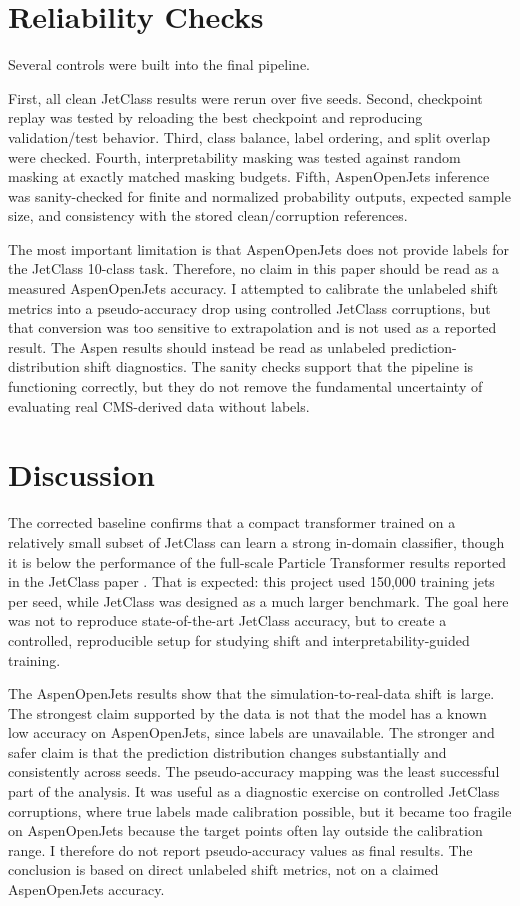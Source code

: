 \documentclass[11pt]{article}
\begin{document}
\section{Reliability Checks}

Several controls were built into the final pipeline.

First, all clean JetClass results were rerun over five seeds. Second, checkpoint replay was tested by reloading the best checkpoint and reproducing validation/test behavior. Third, class balance, label ordering, and split overlap were checked. Fourth, interpretability masking was tested against random masking at exactly matched masking budgets. Fifth, AspenOpenJets inference was sanity-checked for finite and normalized probability outputs, expected sample size, and consistency with the stored clean/corruption references.

The most important limitation is that AspenOpenJets does not provide labels for the JetClass 10-class task. Therefore, no claim in this paper should be read as a measured AspenOpenJets accuracy. I attempted to calibrate the unlabeled shift metrics into a pseudo-accuracy drop using controlled JetClass corruptions, but that conversion was too sensitive to extrapolation and is not used as a reported result. The Aspen results should instead be read as unlabeled prediction-distribution shift diagnostics. The sanity checks support that the pipeline is functioning correctly, but they do not remove the fundamental uncertainty of evaluating real CMS-derived data without labels.



\section{Discussion}

The corrected baseline confirms that a compact transformer trained on a relatively small subset of JetClass can learn a strong in-domain classifier, though it is below the performance of the full-scale Particle Transformer results reported in the JetClass paper \cite{qu2022particle}. That is expected: this project used 150,000 training jets per seed, while JetClass was designed as a much larger benchmark. The goal here was not to reproduce state-of-the-art JetClass accuracy, but to create a controlled, reproducible setup for studying shift and interpretability-guided training.

The AspenOpenJets results show that the simulation-to-real-data shift is large. The strongest claim supported by the data is not that the model has a known low accuracy on AspenOpenJets, since labels are unavailable. The stronger and safer claim is that the prediction distribution changes substantially and consistently across seeds. The pseudo-accuracy mapping was the least successful part of the analysis. It was useful as a diagnostic exercise on controlled JetClass corruptions, where true labels made calibration possible, but it became too fragile on AspenOpenJets because the target points often lay outside the calibration range. I therefore do not report pseudo-accuracy values as final results. The conclusion is based on direct unlabeled shift metrics, not on a claimed AspenOpenJets accuracy.
\end{document}
